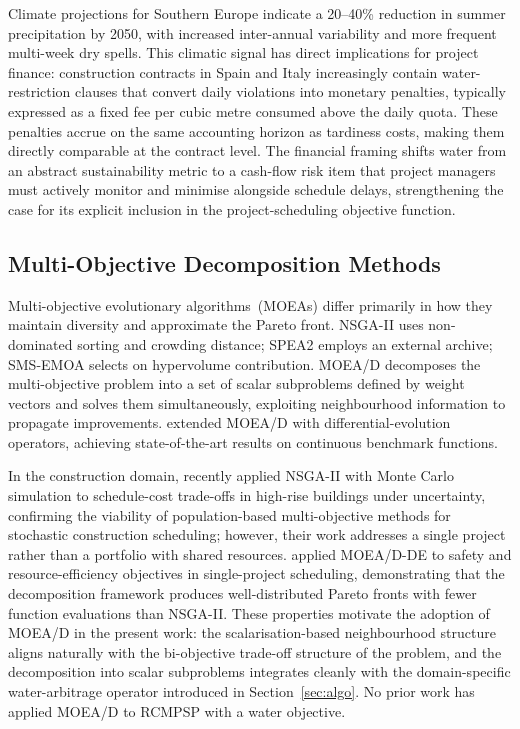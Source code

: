 \documentclass[12pt,a4paper]{article}
\begin{document}
Climate projections for Southern Europe \citep{IPCC2021} indicate a 20--40\%
reduction in summer precipitation by 2050, with increased inter-annual variability
and more frequent multi-week dry spells.  This climatic signal has direct
implications for project finance: construction contracts in Spain and Italy
increasingly contain water-restriction clauses that convert daily violations into
monetary penalties, typically expressed as a fixed fee per cubic metre consumed
above the daily quota.  These penalties accrue on the same accounting horizon as
tardiness costs, making them directly comparable at the contract level.  The
financial framing shifts water from an abstract sustainability metric to a cash-flow
risk item that project managers must actively monitor and minimise alongside schedule
delays, strengthening the case for its explicit inclusion in the project-scheduling
objective function.

\subsection{Multi-Objective Decomposition Methods}
\label{sec:lit:moead}

Multi-objective evolutionary algorithms~(MOEAs) differ primarily in how they
maintain diversity and approximate the Pareto front.  NSGA-II \citep{Deb2002}
uses non-dominated sorting and crowding distance; SPEA2 \citep{Zitzler2001} employs
an external archive; SMS-EMOA \citep{Beume2007} selects on hypervolume contribution.
MOEA/D \citep{Zhang2007} decomposes the multi-objective problem into a set of
scalar subproblems defined by weight vectors and solves them simultaneously,
exploiting neighbourhood information to propagate improvements.  \citet{Li2009}
extended MOEA/D with differential-evolution operators, achieving state-of-the-art
results on continuous benchmark functions.

In the construction domain, \citet{Huang2025} recently applied NSGA-II with
Monte Carlo simulation to schedule-cost trade-offs in high-rise buildings under
uncertainty, confirming the viability of population-based multi-objective methods
for stochastic construction scheduling; however, their work addresses a single
project rather than a portfolio with shared resources.
\citet{Yu2025} applied MOEA/D-DE to safety and
resource-efficiency objectives in single-project scheduling, demonstrating that the
decomposition framework produces well-distributed Pareto fronts with fewer function
evaluations than NSGA-II.  These properties motivate the adoption of MOEA/D in the
present work: the scalarisation-based neighbourhood structure aligns naturally with the
bi-objective trade-off structure of the problem, and the decomposition into scalar
subproblems integrates cleanly with the domain-specific water-arbitrage operator
introduced in Section~\ref{sec:algo}.  No prior work has applied MOEA/D to RCMPSP
with a water objective.
\end{document}
